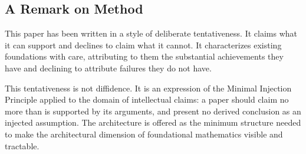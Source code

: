 \documentclass[12pt, a4paper]{article}
\theoremstyle{plain}
\theoremstyle{definition}
\theoremstyle{remark}
\begin{document}
\subsection{A Remark on Method}
\label{subsec:method}

This paper has been written in a style of deliberate tentativeness. It
claims what it can support and declines to claim what it cannot. It
characterizes existing foundations with care, attributing to them the
substantial achievements they have and declining to attribute failures
they do not have.

This tentativeness is not diffidence. It is an expression of the
Minimal Injection Principle applied to the domain of intellectual
claims: a paper should claim no more than is supported by its arguments,
and present no derived conclusion as an injected assumption. The
architecture is offered as the minimum structure needed to make the
architectural dimension of foundational mathematics visible and
tractable.


\newpage
\printbibliography

\end{document}
